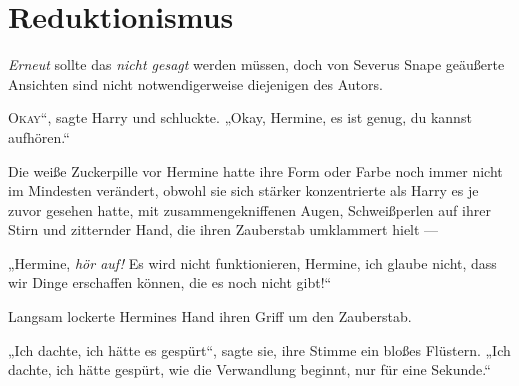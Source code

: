 \chapter{Reduktionismus}

\begin{chapterOpeningAuthorNote}
%
\emph{Erneut} sollte das \emph{nicht gesagt} werden müssen, doch von Severus Snape geäußerte Ansichten sind nicht notwendigerweise diejenigen des Autors.
\end{chapterOpeningAuthorNote}

\lettrine[ante=„]{O}{kay}“, sagte Harry und schluckte.
„Okay, Hermine, es ist genug, du kannst aufhören.“

Die weiße Zuckerpille vor Hermine hatte ihre Form oder Farbe noch immer nicht im Mindesten verändert, obwohl sie sich stärker konzentrierte als Harry es je zuvor gesehen hatte, mit zusammengekniffenen Augen, Schweißperlen auf ihrer Stirn und zitternder Hand, die ihren Zauberstab umklammert hielt —

„Hermine, \emph{hör auf!} Es wird nicht funktionieren, Hermine, ich glaube nicht, dass wir Dinge erschaffen können, die es noch nicht gibt!“

Langsam lockerte Hermines Hand ihren Griff um den Zauberstab.

„Ich dachte, ich hätte es gespürt“, sagte sie, ihre Stimme ein bloßes Flüstern.
„Ich dachte, ich hätte gespürt, wie die Verwandlung beginnt, nur für eine Sekunde.“

